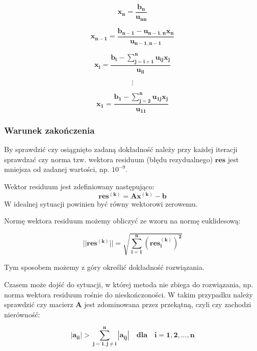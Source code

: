 \documentclass{article}
\begin{document}
\begin{equation*}
    \boldsymbol{x_n = \frac{b_n}{u_{nn}}}
\end{equation*}

\begin{equation*}
    \boldsymbol{x_{n-1} = \frac{b_{n-1} - u_{n-1,n}x_n}{u_{n-1,n-1}}}
\end{equation*}

\begin{equation*}
    \boldsymbol{x_i = \frac{b_i - \sum_{j=i+1}^{n}u_{ij}x_j}{u_{ii}}}
\end{equation*}

\begin{equation*}
    \boldsymbol{\vdots}
\end{equation*}

\begin{equation*}
    \boldsymbol{x_1 = \frac{b_1 - \sum_{j=2}^{n}u_{1j}x_j}{u_{11}}}
\end{equation*}

\subsubsection{Warunek zakończenia}
By sprawdzić czy osiągnięto zadaną dokładność należy przy każdej iteracji
sprawdzać czy norma tzw. wektora residuum (błędu rezydualnego) $\boldsymbol{res}$ jest mniejsza 
od zadanej wartości, np. $10^{-9}$.

Wektor residuum jest zdefiniowany następująco:
\begin{equation}
    \boldsymbol{res^{(k)} = Ax^{(k)}-b}
\end{equation}
W idealnej sytuacji powinien być równy wektorowi zerowemu.

Normę wektora residuum możemy obliczyć ze wzoru na normę euklidesową:

\begin{equation}
    \boldsymbol{||res^{(k)}|| = \sqrt{\sum_{i=1}^{n}(res_i^{(k)})^2}}
\end{equation}

Tym sposobem możemy z góry określić dokładność rozwiązania.

\pagebreak

Czasem może dojść do sytuacji, w której metoda nie zbiega do rozwiązania, np. norma
wektora residuum rośnie do nieskończoności. W takim przypadku należy sprawdzić czy
macierz $\boldsymbol{A}$ jest zdominowana przez przekątną, czyli czy zachodzi nierówność:

\begin{equation}\label{eq:domination}
    \boldsymbol{|a_{ii}| > \sum_{j=1, j\neq i}^{n}|a_{ij}| \quad dla \quad i=1,2,...,n}
\end{equation}
\end{document}
